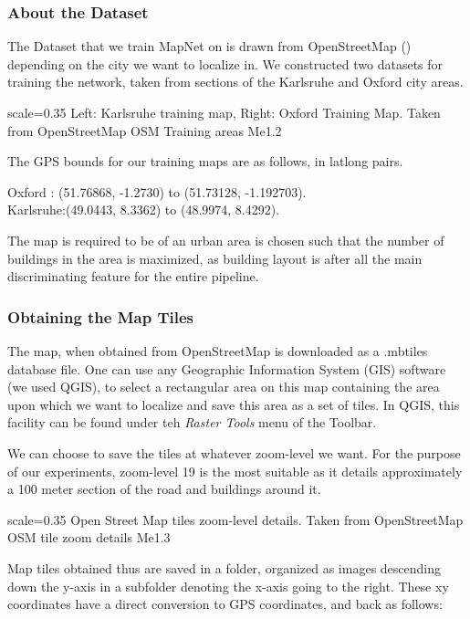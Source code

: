 \subsubsection{About the Dataset}
The Dataset that we train MapNet on is drawn from OpenStreetMap (\cite{osm2017}) depending on the city we want to localize in. We constructed two datasets for training the network, taken from sections of the Karlsruhe and Oxford city areas.

{scale=0.35}%
{Left: Karlsruhe training map, Right: Oxford Training Map. Taken from OpenStreetMap}%
{OSM Training areas}%
{Me1.2}

The GPS bounds for our training maps are as follows, in latlong pairs. 

Oxford : (51.76868, -1.2730) to (51.73128, -1.192703).\\
Karlsruhe:(49.0443, 8.3362) to (48.9974, 8.4292).

The map is required to be of an urban area is chosen such that the number of buildings in the area is maximized, as building layout is after all the main discriminating feature for the entire pipeline. 

\subsubsection{Obtaining the Map Tiles}
The map, when obtained from OpenStreetMap is downloaded as a .mbtiles database file. One can use any Geographic Information System (GIS) software (we used QGIS), to select a rectangular area on this map containing the area upon which we want to localize and save this area as a set of tiles. In QGIS, this facility can be found under teh \emph{Raster Tools} menu of the Toolbar.

We can choose to save the tiles at whatever zoom-level we want. For the purpose of our experiments, zoom-level 19 is the most suitable as it details approximately a 100 meter section of the road and buildings around it.

{scale=0.35}%
{Open Street Map tiles zoom-level details. Taken from OpenStreetMap}%
{OSM tile zoom details}%
{Me1.3}

Map tiles obtained thus are saved in a folder, organized as images descending down the y-axis in a subfolder denoting the x-axis going to the right. These xy coordinates have a direct conversion to GPS coordinates, and back as follows:

